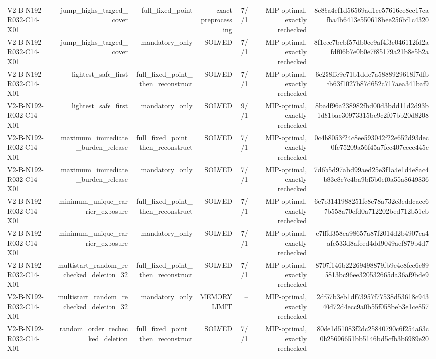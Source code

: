 {\begin{longtable}{lrrrrrr}
V2-B-N192-R032-C14-X01 & jump\_highs\_tagged\_cover & full\_fixed\_point & exact preprocessing & 7//1 & MIP-optimal, exactly rechecked & 8c89a4cf1d56569ad1ce57616ce8cc17cafba4b6413e550618bee256bf1c4320 \\
V2-B-N192-R032-C14-X01 & jump\_highs\_tagged\_cover & mandatory\_only & SOLVED & 7//1 & MIP-optimal, exactly rechecked & 8f1ece7bcbf57db0ce9af4f3e046112fd2afdf06b7e0b0e7f85179a21b8e5b2a \\
V2-B-N192-R032-C14-X01 & lightest\_safe\_first & full\_fixed\_point\_then\_reconstruct & SOLVED & 7//1 & MIP-optimal, exactly rechecked & 6e258ffc9c71b1dde7a5888929618f7dfbcb63f1027b87d652c717aea341baf9 \\
V2-B-N192-R032-C14-X01 & lightest\_safe\_first & mandatory\_only & SOLVED & 9//1 & MIP-optimal, exactly rechecked & 8badf96a238982fbd00d3bdd11d2d93b1d81bac30973315be9c2f07bb20d8208 \\
V2-B-N192-R032-C14-X01 & maximum\_immediate\_burden\_release & full\_fixed\_point\_then\_reconstruct & SOLVED & 7//1 & MIP-optimal, exactly rechecked & 0c4b8053f24c8ee593042f22e652d93dec0fc75209a56f45a7fec407cece445c \\
V2-B-N192-R032-C14-X01 & maximum\_immediate\_burden\_release & mandatory\_only & SOLVED & 7//1 & MIP-optimal, exactly rechecked & 7d6b5d97abd99aed25e3f1a4e1d4e8ac4b83c8c7c4ba9bf5b0ef0a55a8649836 \\
V2-B-N192-R032-C14-X01 & minimum\_unique\_carrier\_exposure & full\_fixed\_point\_then\_reconstruct & SOLVED & 7//1 & MIP-optimal, exactly rechecked & 6e7e3141988251fc8c78a732c3eddcacc67b558a70efd0a712202bed712b51cb \\
V2-B-N192-R032-C14-X01 & minimum\_unique\_carrier\_exposure & mandatory\_only & SOLVED & 7//1 & MIP-optimal, exactly rechecked & e7fffd358ea98657a87f2014d2b4907ea4afc533d8afeed4dd9049aef879b4d7 \\
V2-B-N192-R032-C14-X01 & multistart\_random\_rechecked\_deletion\_32 & full\_fixed\_point\_then\_reconstruct & SOLVED & 7//1 & MIP-optimal, exactly rechecked & 8707f146b22269498879fb9e4e8fce6c895813bc96ee320532665da36af9bde9 \\
V2-B-N192-R032-C14-X01 & multistart\_random\_rechecked\_deletion\_32 & mandatory\_only & MEMORY\_LIMIT & -- & MIP-optimal, exactly rechecked & 2df57b3eb1df73957f77538d53618c94340d72d4ecc9a0b55f058beb3e1ce857 \\
V2-B-N192-R032-C14-X01 & random\_order\_rechecked\_deletion & full\_fixed\_point\_then\_reconstruct & SOLVED & 7//1 & MIP-optimal, exactly rechecked & 80de1d51083f2dc25840790c6f254a63c0b25696651bb5146bd5cfb3b6989e20 \\

\end{longtable}}
